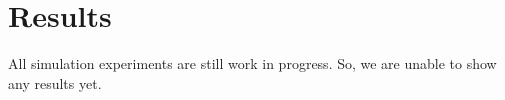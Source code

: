 \documentclass[../main.tex]{subfiles}
\begin{document}
\section{Results}

All simulation experiments are still work in progress.
So, we are unable to show any results yet.
\end{document}
